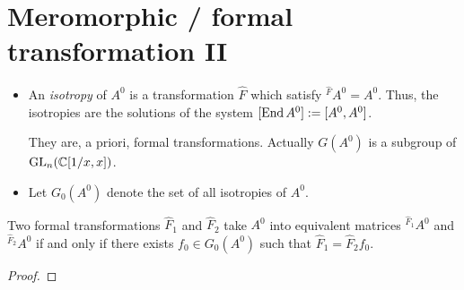 \section{Meromorphic / formal transformation II}
\begin{defn}
  \begin{itemize}
    \item An \emph{isotropy} of $A^0$ is a transformation $\hat F$ which
      satisfy ${}^{\hat F}\!A^0=A^0$.
      Thus, the isotropies are the solutions of the system
      $[\operatorname{End} A^0]:=[A^0,A^0]$.
      \begin{rem}
        They are, a priori, formal transformations. Actually $G(A^0)$ is a
        subgroup of $\operatorname{GL}_n(\mathbb{C}[1/x,x])$.
      \end{rem}
    \item Let $G_0(A^0)$ denote the set of all isotropies of $A^0$.
      \begin{comment}
        In the nice case this is only $T$?
      \end{comment}
  \end{itemize}
\end{defn}
\begin{lem}
  Two formal transformations $\hat F_1$ and $\hat F_2$ take $A^0$ into
  equivalent matrices ${}^{\hat F_1}\!A^0$ and  ${}^{\hat F_2}\!A^0$ if and
  only if there exists $f_0\in G_0(A^0)$ such that $\hat F_1=\hat F_2f_0$.
\end{lem}
\begin{proof}
  \TODO
\end{proof}

